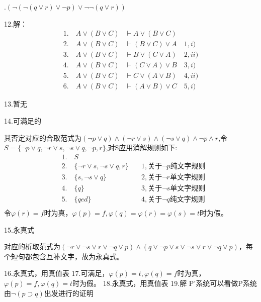 \documentclass[a4paper]{ctexart}
\begin{document}
.$ \left( \neg \left( \neg \left( q\vee r\right)\vee \neg p \right)\vee \neg \neg \left( q\vee r\right) \right)$\newline

\noindent 12.解：
\begin{align*}
    1.\quad A\vee (B\vee C)&\vdash A\vee (B\vee C) \\
    2.\quad A\vee (B\vee C)&\vdash (B\vee C)\vee A\quad 1, i) \\
    3.\quad A\vee (B\vee C)&\vdash B\vee (C\vee A)\quad 2, ii) \\
    4.\quad A\vee (B\vee C)&\vdash (C\vee A) \vee B\quad 3, i) \\
    5.\quad A\vee (B\vee C)&\vdash C\vee (A \vee B)\quad 4, ii) \\
    6.\quad A\vee (B\vee C)&\vdash (A\vee B) \vee C\quad 5, i)
\end{align*}

\noindent 13.暂无

\noindent 14.可满足的

其否定对应的合取范式为$(\neg p\vee q)\wedge(\neg r\vee s)\wedge(\neg s\vee q)\wedge \neg p \wedge r$,令$S=\{\neg p\vee q,\neg r\vee s,\neg s\vee q,\neg p,r\}$,对S应用消解规则如下:
\begin{align*}
    &1.\quad S &\\
    &2.\quad \{\neg r\vee s, \neg s\vee q, r\} \quad &1,\text{关于}\neg p\text{纯文字规则} \\
    &3.\quad \{s, \neg s\vee q\} \quad &2,\text{关于}\neg r\text{单文字规则}\\
    &4.\quad \{q\} \quad &3,\text{关于}\neg s\text{单文字规则}\\
    &5.\quad \{qed\} \quad &4,\text{关于}\neg q\text{纯文字规则}\\
\end{align*}
令$\varphi(r)=f$时为真，$\varphi(p)=f,\varphi(q)=\varphi(r)=\varphi(s)=t$时为假。\newline

\noindent 15.永真式

对应的析取范式为$(\neg r\vee \neg s\vee r\vee \neg q\vee p)\wedge (q\vee \neg p\vee s\vee \neg s\vee r\vee \neg q\vee p)$，每个短句都包含互补文字，故为永真式。\newline

\noindent 16.永真式，用真值表\newline
\noindent 17.可满足，$\varphi(p)=t, \varphi(q)=f$时为真，$\varphi(p)=f, \varphi(q)=t$时为假。\newline
\noindent 18.永真式，用真值表\newline
\noindent 19.解
P'系统可以看做P系统由$\neg(p\supset q)$出发进行的证明
\end{document}
